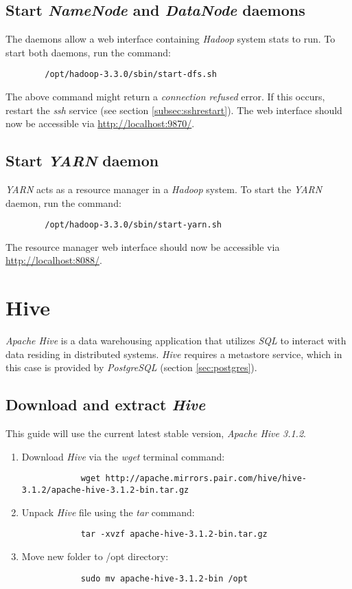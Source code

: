 \documentclass{article}
\begin{document}
    \subsection{Start \emph{NameNode} and \emph{DataNode} daemons}
    The daemons allow a web interface containing \emph{Hadoop} system stats to run. To start both
    daemons, run the command:
    \begin{verbatim}
        /opt/hadoop-3.3.0/sbin/start-dfs.sh
    \end{verbatim}
    The above command might return a \emph{connection refused} error. If this occurs, restart
    the \emph{ssh} service (see section \ref{subsec:sshrestart}). The web interface should now be
    accessible via \url{http://localhost:9870/}.

    \subsection{Start \emph{YARN} daemon}
    \emph{YARN} acts as a resource manager in a \emph{Hadoop} system. To start the \emph{YARN} daemon,
    run the command:
    \begin{verbatim}
        /opt/hadoop-3.3.0/sbin/start-yarn.sh
    \end{verbatim}
    The resource manager web interface should now be accessible via
    \url{http://localhost:8088/}.

\section{Hive}
\emph{Apache Hive} is a data warehousing application that utilizes \emph{SQL} to interact with
data residing in distributed systems. \emph{Hive} requires a metastore service, which in this case
is provided by \emph{PostgreSQL} (section \ref{sec:postgres}).

    \subsection{Download and extract \emph{Hive}}
    This guide will use the current latest stable version, \emph{Apache Hive 3.1.2}.
    \begin{enumerate}
        \item Download \emph{Hive} via the \emph{wget} terminal command:
        \begin{verbatim}
            wget http://apache.mirrors.pair.com/hive/hive-3.1.2/apache-hive-3.1.2-bin.tar.gz
        \end{verbatim}

        \item Unpack \emph{Hive} file using the \emph{tar} command:
        \begin{verbatim}
            tar -xvzf apache-hive-3.1.2-bin.tar.gz
        \end{verbatim}

        \item Move new folder to /opt directory:
        \begin{verbatim}
            sudo mv apache-hive-3.1.2-bin /opt
        \end{verbatim}
    \end{enumerate}
\end{document}
